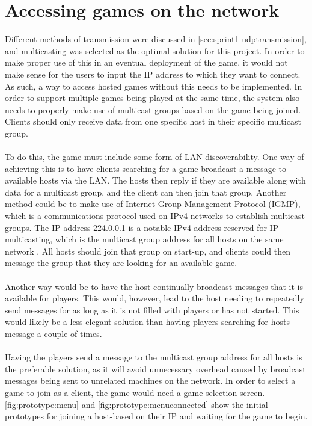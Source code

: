 \section{Accessing games on the network}
Different methods of transmission were discussed in \autoref{sec:sprint1-udptransmission}, and multicasting was selected as the optimal solution for this project.
In order to make proper use of this in an eventual deployment of the game, it would not make sense for the users to input the IP address to which they want to connect.
As such, a way to access hosted games without this needs to be implemented.
In order to support multiple games being played at the same time, the system also needs to properly make use of multicast groups based on the game being joined.
Clients should only receive data from one specific host in their specific multicast group.
\\\\
To do this, the game must include some form of LAN discoverability.
One way of achieving this is to have clients searching for a game broadcast a message to available hosts via the LAN.
The hosts then reply if they are available along with data for a multicast group, and the client can then join that group.
Another method could be to make use of Internet Group Management Protocol (IGMP), which is a communications protocol used on IPv4 networks to establish multicast groups.
The IP address 224.0.0.1 is a notable IPv4 address reserved for IP multicasting, which is the multicast group address for all hosts on the same network \cite{ipv4multicastaddresses}.
All hosts should join that group on start-up, and clients could then message the group that they are looking for an available game.
\\\\
Another way would be to have the host continually broadcast messages that it is available for players.
This would, however, lead to the host needing to repeatedly send messages for as long as it is not filled with players or has not started.
This would likely be a less elegant solution than having players searching for hosts message a couple of times.
\\\\
Having the players send a message to the multicast group address for all hosts is the preferable solution, as it will avoid unnecessary overhead caused by broadcast messages being sent to unrelated machines on the network.
In order to select a game to join as a client, the game would need a game selection screen.
\autoref{fig:prototype:menu} and \autoref{fig:prototype:menuconnected} show the initial prototypes for joining a host-based on their IP and waiting for the game to begin.
